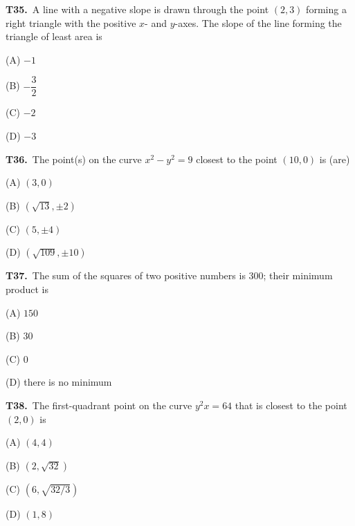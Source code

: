 \documentclass[11pt]{article}
\begin{document}
\bigskip\noindent\textbf{T35.}\ A line with a negative slope is drawn through the point $(2,3)$ forming a right triangle with the positive $x$- and $y$-axes. The slope of the line forming the triangle of least area is
\begin{list}{}{\setlength{\leftmargin}{3em}\setlength{\labelwidth}{2.5em}\setlength{\itemsep}{0pt}\setlength{\topsep}{2pt}}
\item[(A)] $-1$
\item[(B)] $-\dfrac{3}{2}$
\item[(C)] $-2$
\item[(D)] $-3$
\end{list}

\bigskip\noindent\textbf{T36.}\ The point(s) on the curve $x^2-y^2=9$ closest to the point $(10,0)$ is (are)
\begin{list}{}{\setlength{\leftmargin}{3em}\setlength{\labelwidth}{2.5em}\setlength{\itemsep}{0pt}\setlength{\topsep}{2pt}}
\item[(A)] $(3,0)$
\item[(B)] $\left(\sqrt{13},\pm 2\right)$
\item[(C)] $(5,\pm 4)$
\item[(D)] $\left(\sqrt{109},\pm 10\right)$
\end{list}

\bigskip\noindent\textbf{T37.}\ The sum of the squares of two positive numbers is 300; their minimum product is
\begin{list}{}{\setlength{\leftmargin}{3em}\setlength{\labelwidth}{2.5em}\setlength{\itemsep}{0pt}\setlength{\topsep}{2pt}}
\item[(A)] $150$
\item[(B)] $30$
\item[(C)] $0$
\item[(D)] there is no minimum
\end{list}

\bigskip\noindent\textbf{T38.}\ The first-quadrant point on the curve $y^2x = 64$ that is closest to the point $(2,0)$ is
\begin{list}{}{\setlength{\leftmargin}{3em}\setlength{\labelwidth}{2.5em}\setlength{\itemsep}{0pt}\setlength{\topsep}{2pt}}
\item[(A)] $(4,4)$
\item[(B)] $\left(2,\sqrt{32}\right)$
\item[(C)] $\left(6,\sqrt{32/3}\right)$
\item[(D)] $(1,8)$
\end{list}
\end{document}

